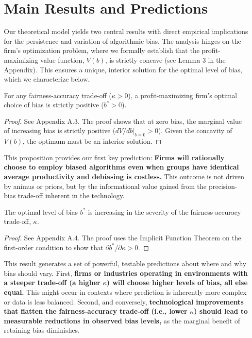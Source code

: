\section{Main Results and Predictions}

Our theoretical model yields two central results with direct empirical implications for the persistence and variation of algorithmic bias. The analysis hinges on the firm's optimization problem, where we formally establish that the profit-maximizing value function, $V(b)$, is strictly concave (see Lemma 3 in the Appendix). This ensures a unique, interior solution for the optimal level of bias, which we characterize below.

\begin{proposition}
\label{prop:existence}
For any fairness-accuracy trade-off ($\kappa > 0$), a profit-maximizing firm's optimal choice of bias is strictly positive ($b^* > 0$).
\end{proposition}
\begin{proof}
See Appendix A.3. The proof shows that at zero bias, the marginal value of increasing bias is strictly positive ($dV/db|_{b=0} > 0$). Given the concavity of $V(b)$, the optimum must be an interior solution.
\end{proof}

This proposition provides our first key prediction: \textbf{Firms will rationally choose to employ biased algorithms even when groups have identical average productivity and debiasing is costless.} This outcome is not driven by animus or priors, but by the informational value gained from the precision-bias trade-off inherent in the technology.

\begin{proposition}
\label{prop:comparative_static}
The optimal level of bias $b^*$ is increasing in the severity of the fairness-accuracy trade-off, $\kappa$.
\end{proposition}
\begin{proof}
See Appendix A.4. The proof uses the Implicit Function Theorem on the first-order condition to show that $\partial b^*/\partial\kappa > 0$.
\end{proof}

This result generates a set of powerful, testable predictions about where and why bias should vary. 
First, \textbf{firms or industries operating in environments with a steeper trade-off (a higher $\kappa$) will choose higher levels of bias, all else equal.} This might occur in contexts where prediction is inherently more complex or data is less balanced.
Second, and conversely, \textbf{technological improvements that flatten the fairness-accuracy trade-off (i.e., lower $\kappa$) should lead to measurable reductions in observed bias levels,} as the marginal benefit of retaining bias diminishes.

